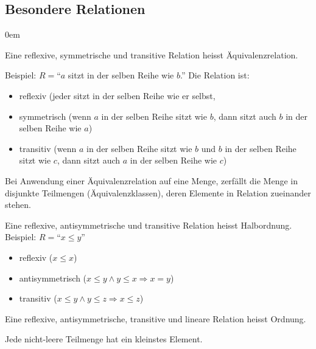 \subsection{Besondere Relationen}
\begin{description}\itemsep0em
	\item [Äquivalenzrelation]
	Eine reflexive, symmetrische und transitive Relation heisst Äquivalenzrelation.

	Beispiel: $R = $\enquote{$a$ sitzt in der selben Reihe wie $b$.} Die Relation ist:
	\begin{itemize}
		\item reflexiv (jeder sitzt in der selben Reihe wie er selbst,
		\item symmetrisch (wenn $a$ in der selben Reihe sitzt wie $b$, dann sitzt auch $b$ in der selben Reihe wie $a$)
		\item transitiv (wenn $a$ in der selben Reihe sitzt wie $b$ und $b$ in der selben Reihe sitzt wie $c$, dann sitzt auch $a$ in der selben Reihe wie $c$)
	\end{itemize}
	Bei Anwendung einer Äquivalenzrelation auf eine Menge, zerfällt die Menge in disjunkte Teilmengen (Äquivalenzklassen), deren Elemente in Relation zueinander stehen.

	\item[Halbordnung]
	Eine reflexive, antisymmetrische und transitive Relation heisst Halbordnung.
	Beispiel: $R = $\enquote{$x \leq y$}
	\begin{itemize}
		\item reflexiv ($x \leq x$)
		\item antisymmetrisch ($x \leq y \wedge y \leq x \Rightarrow x = y$) 
		\item transitiv ($x \leq y \wedge y \leq z \Rightarrow x \leq z$)
	\end{itemize}

	\item[Ordnung]
	Eine reflexive, antisymmetrische, transitive und lineare Relation heisst Ordnung.

	\item[Wohlordnung]
	Jede nicht-leere Teilmenge hat ein kleinstes Element.
	
\end{description}

